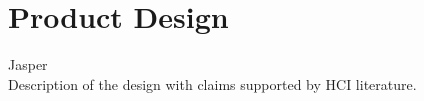 \section{Product Design}
	Jasper\\
	Description of the design with claims supported by HCI literature.